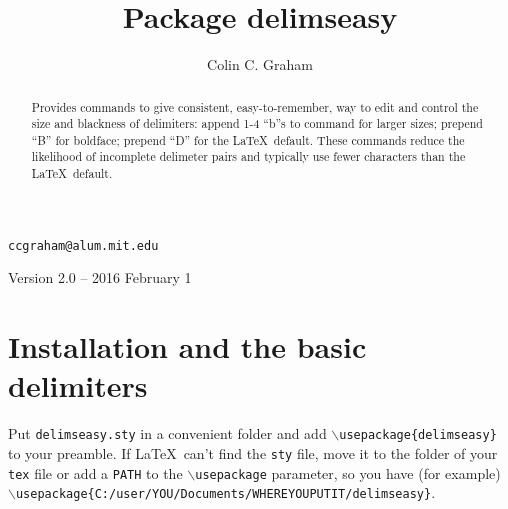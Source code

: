 \documentclass{amsart}
\title[delimseasy]{Package delimseasy}
\author[Graham]{Colin C. Graham}
\begin{document}
\begin{abstract}  Provides commands to give consistent, easy-to-remember, way to edit and  control the size  and blackness
 of delimiters: append 1-4 ``b''s to command for larger sizes; prepend ``B'' for boldface; prepend ``D'' for the
 \LaTeX\ default. These commands reduce the likelihood 
 of incomplete delimeter pairs and typically use fewer characters than the \LaTeX\ default. 
 \end{abstract}
 
\maketitle
 
\centerline{\texttt{ccgraham@alum.mit.edu}}


\centerline{Version 2.0 -- 2016 February 1}


{\smaller
\tableofcontents}

\vspace{-.75in}

\section{Installation and the basic delimiters}
Put \texttt{delimseasy.sty} in a convenient folder and
add
\texttt{$\backslash$usepackage\{delimseasy\}}
 to your  preamble. If  \LaTeX \ can't find the \texttt{sty} file,
 move it to the folder of your \texttt{tex} file 
or add a \texttt{PATH} to the \texttt{$\backslash$usepackage} parameter, so you have (for example)
\newline
\texttt{$\backslash$usepackage\{C:/user/YOU/Documents/WHEREYOUPUTIT/delimseasy\}}.
\end{document}
